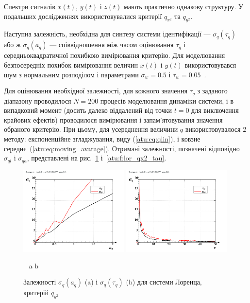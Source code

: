 Спектри сигналів $x(t)$, $y(t)$ і $z(t)$ мають практично однакову
структуру. У подальших дослідженнях використовувалися критерії
$q_{x^2}$ та
$q_{y^2}$.

Наступна залежність, необхідна для синтезу системи
ідентифікації ---
$ \sigma_q (\tau_q) $\label{atu:d:sigma_q} або ж
$ \sigma_q (a_q) $ --- співвідношення між часом оцінювання
$ \tau_q $ і середньоквадратичної похибкою вимірювання критерію. Для
моделювання безпосередніх похибок вимірювання величин
$ x (t) $ і
$ y (t) $ використовувався шум з нормальним розподілом і
параметрами
$ \sigma_w = 0.5 $ і
$ \tau_w = 0.05 $~\cite{atu_asau26}.

Для оцінювання необхідної залежності, для кожного значення
$ \tau_q $ з заданого діапазону проводилося
$ N = 200 $ процесів моделювання динаміки системи, і в випадковий
момент (досить далеко віддалений від точки
$ t = 0 $ для виключення крайових ефектів) проводилося вимірювання
і запам'ятовування значення обраного критерію. При цьому, для усереднення
величини
$ q $ використовувалося 2 методу: експоненційне згладжування,
виду (\ref{atu:eq:qlin}), і ковзне середнє~(\ref{atu:eq:moving_avarage}). Отримані
залежності, позначені відповідно
$ \sigma_{ql} $ і
$ \sigma_{qa} $, представлені на рис.~\ref{atu:f:lor_qy2_tau} і~\ref{atu:f:lor_qx2_tau}.


\begin{figure}[ht!]
\begin{center}
  \includegraphics[width=0.49\textwidth]{p/cha/lor/lor_q_tau-p_aq_sd.png}
  \hfill
  \includegraphics[width=0.49\textwidth]{p/cha/lor/lor_q_tau-p_tau_sd.png}
\end{center}
  \vspace{-1.0ex}
  \begin{center}
    ~ \hfill a \hfill\hfill b \hfill ~
  \end{center}
  \vspace{-1.5ex}
  \caption{Залежності $ \sigma_{q} (a_q) $ (a) і $ \sigma_{q} (\tau_q) $ (b) для системи Лоренца, критерій $q_{y^2}$}
\label{atu:f:lor_qy2_tau}
\end{figure}


